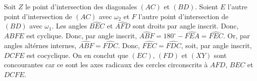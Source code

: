\begin{sol}
\begin{center}
\end{center}

Soit $Z$ le point d'intersection des diagonales $\left(AC\right)$ et $\left(BD\right)$. Soient $E$ l'autre point d'intersection de $\left(AC\right)$ avec $\omega_2$ et $F$ l'autre point d'intersection de $\left(BD\right)$ avec $\omega_1$. Les angles $\widehat{BEC}$ et $\widehat{AFD}$ sont droits par angle inscrit. Donc, $ABFE$ est cyclique. Donc, par angle inscrit, $\widehat{ABF} = 180^\circ - \widehat{FEA} = \widehat{FEC}$. Or, par angles altérnes internes, $\widehat{ABF} = \widehat{FDC}$. Donc, $\widehat{FEC} = \widehat{FDC}$, soit, par angle inscrit, $DCFE$ est cocyclique. On en conclut que $\left(EC\right)$, $\left(FD\right)$ et $\left(XY\right)$ sont concourantes car ce sont les axes radicaux des cercles circonscrits à $AFD$, $BEC$ et $DCFE$.
\end{sol}


